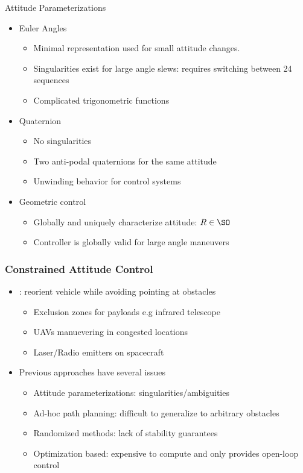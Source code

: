 \begin{frame}{Attitude Parameterizations}
    \begin{itemize}
        \item Euler Angles
        \begin{itemize}
            \item Minimal representation used for small attitude changes.
            \item Singularities exist for large angle slews: requires switching between 24 sequences
            \item Complicated trigonometric functions
        \end{itemize}
        \pause
        \vs
        \item Quaternion 
        \begin{itemize}
            \item No singularities
            \item Two anti-podal quaternions for the same attitude
            \item Unwinding behavior for control systems
        \end{itemize}
        \pause
        \vs
        \item Geometric control
        \begin{itemize}
            \item Globally and uniquely characterize attitude: \( R \in \SO \)
            \item Controller is globally valid for large angle maneuvers
        \end{itemize}
    \end{itemize}

\end{frame}

\begin{frame}[t]\frametitle{Constrained Attitude Control}
    \begin{itemize}
    \item {} : reorient vehicle while avoiding pointing at obstacles
    \begin{itemize}
        \item Exclusion zones for payloads e.g infrared telescope
        \item UAVs manuevering in congested locations
        \item Laser/Radio emitters on spacecraft
    \end{itemize}
    \pause
    \vs
    \item Previous approaches have several issues
    \begin{itemize}
        \item Attitude parameterizations: singularities/ambiguities
        \item Ad-hoc path planning: difficult to generalize to arbitrary obstacles
        \item Randomized methods: lack of stability guarantees
        \item Optimization based: expensive to compute and only provides open-loop control  
    \end{itemize}
\end{itemize}


\end{frame}